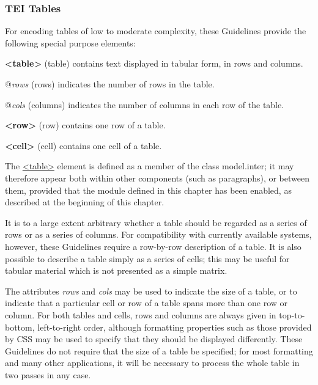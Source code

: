 \subsubsection[{TEI Tables}]{TEI Tables}\label{FTTAB1}\par
For encoding tables of low to moderate complexity, these Guidelines provide the following special purpose elements: 
\begin{sansreflist}
  
\item [\textbf{<table>}] (table) contains text displayed in tabular form, in rows and columns.\hfil\\[-10pt]\begin{sansreflist}
    \item[@{\itshape rows}]
  (rows) indicates the number of rows in the table.
    \item[@{\itshape cols}]
  (columns) indicates the number of columns in each row of the table.
\end{sansreflist}  
\item [\textbf{<row>}] (row) contains one row of a table.
\item [\textbf{<cell>}] (cell) contains one cell of a table.
\end{sansreflist}
\par
The \hyperref[TEI.table]{<table>} element is defined as a member of the class \textsf{model.inter}; it may therefore appear both within other components (such as paragraphs), or between them, provided that the module defined in this chapter has been enabled, as described at the beginning of this chapter.\par
It is to a large extent arbitrary whether a table should be regarded as a series of rows or as a series of columns. For compatibility with currently available systems, however, these Guidelines require a row-by-row description of a table. It is also possible to describe a table simply as a series of cells; this may be useful for tabular material which is not presented as a simple matrix. \par
The attributes {\itshape rows} and {\itshape cols} may be used to indicate the size of a table, or to indicate that a particular cell or row of a table spans more than one row or column. For both tables and cells, rows and columns are always given in top-to-bottom, left-to-right order, although formatting properties such as those provided by CSS may be used to specify that they should be displayed differently. These Guidelines do not require that the size of a table be specified; for most formatting and many other applications, it will be necessary to process the whole table in two passes in any case.\par

